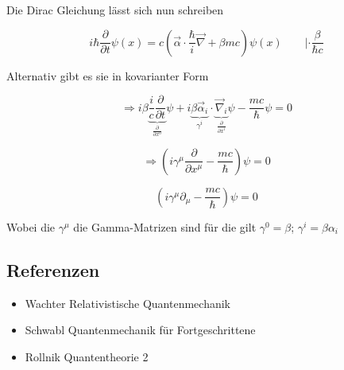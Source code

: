 Die Dirac Gleichung lässt sich nun schreiben

\begin{equation}
  \label{eq:16}
  i\hbar \frac{\partial}{\partial t}\psi(x) = c(\vec \alpha\cdot\frac{\hbar}{i}\vec \nabla + \beta mc)\psi(x) \qquad |\cdot \frac{\beta}{\hbar c}
\end{equation}


Alternativ gibt es sie in kovarianter Form

\[\Rightarrow i\beta \underbrace{\frac{i}{c}\frac{\partial}{\partial t}}_{\frac{\partial}{\partial x^0}}\psi+i\underbrace{\beta\vec \alpha_i}_{\gamma^i}\cdot\underbrace{\vec\nabla_i}_{\frac{\partial}{\partial x^i} }\psi-\frac{mc}{\hbar}\psi=0\]

\[\Rightarrow (i\gamma^\mu\frac{\partial}{\partial x^\mu} - \frac{mc}{\hbar})\psi = 0 \]

\begin{equation}
  \label{eq:17}
  \boxed{\left(i\gamma^\mu\partial_\mu - \frac{mc}{\hbar}\right)\psi=0}
\end{equation}


Wobei die \(\gamma^\mu\) die Gamma-Matrizen sind für die gilt \(\gamma^0 = \beta\); \(\gamma^i = \beta\alpha_i\)




\subsection*{Referenzen}
\begin{itemize}
\item Wachter Relativistische Quantenmechanik
\item Schwabl Quantenmechanik für Fortgeschrittene
\item Rollnik Quantentheorie 2
\end{itemize}


